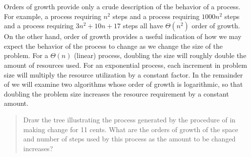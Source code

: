 Orders of growth provide only a crude description of the behavior of a process.
For example, a process requiring \( n^2 \) steps and a process requiring
\( 1000n^2 \) steps and a process requiring \( 3n^2 + 10n + 17 \) steps all
have \( \Theta(n^2) \) order of growth.  On the other hand, order of growth
provides a useful indication of how we may expect the behavior of the process
to change as we change the size of the problem.  For a \( \Theta(n) \)
(linear) process, doubling the size will roughly double the amount of resources
used.  For an exponential process, each increment in problem size will multiply
the resource utilization by a constant factor.  In the remainder of
 we will examine two algorithms whose order of growth is logarithmic,
so that doubling the problem size increases the resource requirement by a
constant amount.

\begin{quote}
 Draw the tree illustrating the
process generated by the  procedure of 
in making change for 11 cents.  What are the orders of growth of the space and
number of steps used by this process as the amount to be changed increases?
\end{quote}

